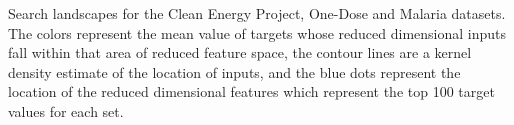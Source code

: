 Search landscapes for the Clean Energy Project, One-Dose and Malaria datasets.  
The colors represent the mean value of targets whose reduced dimensional inputs fall within that area of reduced feature space,
the contour lines are a kernel density estimate of the location of inputs, and the blue dots represent the location of the reduced
dimensional features which represent the top 100 target values for each set.
\label{fig:info_landscapes}